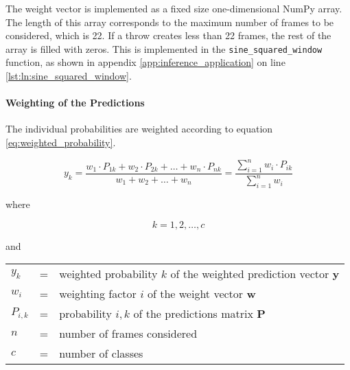 The weight vector is implemented as a fixed size one-dimensional NumPy array. %
The length of this array corresponds to the maximum number of frames to be considered, which is \num{22}.
If a throw creates less than \num{22} frames, the rest of the array is filled with zeros.
This is implemented in the \texttt{sine\_squared\_window} function, as shown in appendix \ref{app:inference_application} on line \ref{lst:ln:sine_squared_window}.

\paragraph{Weighting of the Predictions} %
The individual probabilities are weighted according to equation \ref{eq:weighted_probability}.

\begin{equation}
  y_k = \frac{w_1 \cdot P_{1k} + w_2 \cdot P_{2k} + \dots + w_n \cdot P_{nk}}{w_1 + w_2 + \dots + w_n} = \frac{\sum\limits_{i=1}^{n} w_i \cdot P_{ik}}{\sum\limits_{i=1}^{n} w_i}
  \label{eq:weighted_probability}
\end{equation}

where

\[
  k = 1, 2, \dots, c
\]

and

\begin{tabular}{lll}
  $y_k$ & = & weighted probability $k$ of the weighted prediction vector $\boldsymbol{y}$ \\ %
  $w_i$ & = & weighting factor $i$ of the weight vector $\boldsymbol{w}$ \\
  $P_{i,k}$ & = & probability $i,k$ of the predictions matrix $\boldsymbol{P}$ \\
  $n$ & = & number of frames considered \\
  $c$ & = & number of classes \\
\end{tabular}
\\

